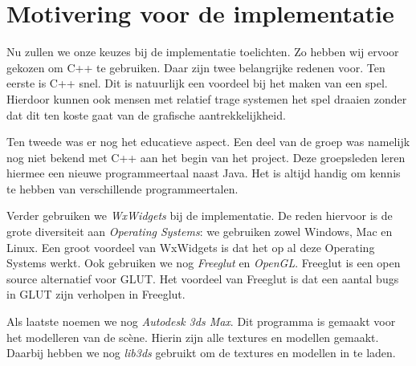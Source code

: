 \section{Motivering voor de implementatie}
Nu zullen we onze keuzes bij de implementatie toelichten. Zo hebben wij ervoor gekozen om C++ te gebruiken. Daar zijn twee belangrijke redenen voor. Ten eerste is C++ snel. Dit is natuurlijk een voordeel bij het maken van een spel. Hierdoor kunnen ook mensen met relatief trage systemen het spel draaien zonder dat dit ten koste gaat van de grafische aantrekkelijkheid.

Ten tweede was er nog het educatieve aspect. Een deel van de groep was namelijk nog niet bekend met C++ aan het begin van het project. Deze groepsleden leren hiermee een nieuwe programmeertaal naast Java. Het is altijd handig om kennis te hebben van verschillende programmeertalen.

Verder gebruiken we \emph{WxWidgets} bij de implementatie. De reden hiervoor is de grote diversiteit aan \emph{Operating Systems}: we gebruiken zowel Windows, Mac en Linux. Een groot voordeel van WxWidgets is dat het op al deze Operating Systems werkt. Ook gebruiken we nog \emph{Freeglut} en \emph{OpenGL}. Freeglut is een open source alternatief voor GLUT. Het voordeel van Freeglut is dat een aantal bugs in GLUT zijn verholpen in Freeglut.

Als laatste noemen we nog \emph{Autodesk 3ds Max}. Dit programma is gemaakt voor het modelleren van de sc\`ene. Hierin zijn alle textures en modellen gemaakt. Daarbij hebben we nog \emph{lib3ds} gebruikt om de textures en modellen in te laden.